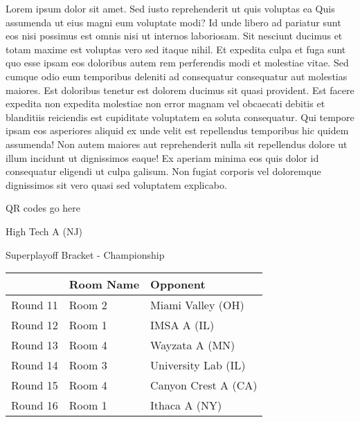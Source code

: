 \documentclass{article}%
\begin{document}
\vspace*{8pt}%
\linebreak%
\newline%
\newline%
    Lorem ipsum dolor sit amet. Sed iusto reprehenderit ut quis voluptas ea Quis assumenda ut eius magni eum voluptate modi? Id unde libero ad pariatur sunt eos nisi possimus est omnis nisi ut internos laboriosam. Sit nesciunt ducimus et totam maxime est voluptas vero sed itaque nihil. Et expedita culpa et fuga sunt quo esse ipsam eos doloribus autem rem perferendis modi et molestiae vitae.\newline%
\newline%
    Sed cumque odio eum temporibus deleniti ad consequatur consequatur aut molestias maiores. Est doloribus tenetur est dolorem ducimus sit quasi provident. Est facere expedita non expedita molestiae non error magnam vel obcaecati debitis et blanditiis reiciendis est cupiditate voluptatem ea soluta consequatur. Qui tempore ipsam eos asperiores aliquid ex unde velit est repellendus temporibus hic quidem assumenda!\newline%
\newline%
    Non autem maiores aut reprehenderit nulla sit repellendus dolore ut illum incidunt ut dignissimos eaque! Ex aperiam minima eos quis dolor id consequatur eligendi ut culpa galisum. Non fugiat corporis vel doloremque dignissimos sit vero quasi sed voluptatem explicabo.\newline%
\newline%
\vspace*{30pt}%
\begin{center}%
\begin{Huge}%
QR codes go here%
\end{Huge}%
\end{center}%
\newpage%
\begin{center}%
\begin{Huge}%
High Tech A (NJ)%
\end{Huge}%
\vspace*{8pt}%
\linebreak%
\begin{Large}%
Superplayoff Bracket {-} Championship%
\end{Large}%
\end{center}%
%
\begin{tabularx}{\textwidth}{|c|Y|Y|}%
\hline%
&Room Name&Opponent\\%
\hline%
Round 11&Room 2&Miami Valley (OH)\\%
Round 12&Room 1&IMSA A (IL)\\%
Round 13&Room 4&Wayzata A (MN)\\%
Round 14&Room 3&University Lab (IL)\\%
Round 15&Room 4&Canyon Crest A (CA)\\%
Round 16&Room 1&Ithaca A (NY)\\%
\hline%
\end{tabularx}%
\end{document}
